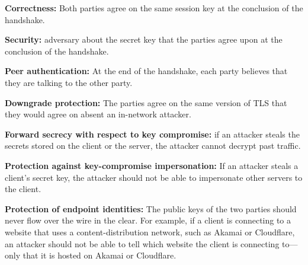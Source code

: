 \begin{compactitem}
\item \textbf{Correctness:} Both parties agree on the same session key 
        at the conclusion of the handshake.
      \item \textbf{Security:} adversary  about the secret
        key that the parties agree upon at the conclusion of the handshake.
      \item \textbf{Peer authentication:} At the end of the handshake, each party believes that they are talking to the other party.
      \item \textbf{Downgrade protection:} The parties agree on the same version of TLS that they would agree on absent an in-network attacker.
      \item \textbf{Forward secrecy with respect
        to key compromise:} if an attacker
        steals the secrets stored on the client or the server, 
        the attacker cannot decrypt past traffic.
      \item \textbf{Protection against key-compromise impersonation:} If an
        attacker steals a client's secret key, the attacker should not be able
        to impersonate other servers to the client.
      \item \textbf{Protection of endpoint
        identities:} The public keys of the two
        parties should never flow over the wire in
        the clear. For example, if a client is
        connecting to a website that uses
        a content-distribution network, such as
        Akamai or Cloudflare, an attacker should
        not be able to tell which website the
        client is connecting to---only that it is
        hosted on Akamai or Cloudflare.
\end{compactitem}

